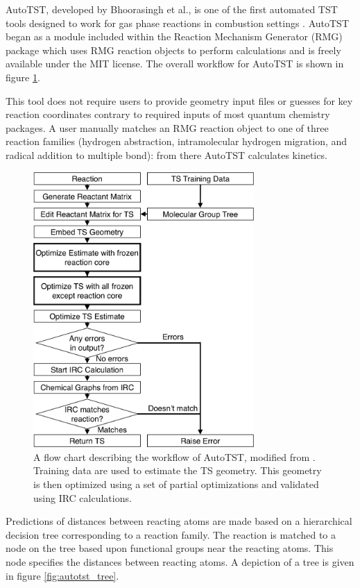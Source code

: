 \documentclass[preprint, 11pt]{elsarticle} %
\begin{document}
AutoTST, developed by Bhoorasingh et al., is one of the first automated TST tools designed to work for gas phase reactions in combustion settings \cite{bhoorasingh:2017}.
AutoTST began as a module included within the Reaction Mechanism Generator (RMG) package which uses RMG reaction objects to perform calculations and is freely available under the MIT license. 
The overall workflow for AutoTST is shown in figure \ref{fig:autotst-overview}.

This tool does not require users to provide geometry input files or guesses for key reaction coordinates contrary to required inputs of most quantum chemistry packages.
A user manually matches an RMG reaction object to one of three reaction families (hydrogen abstraction, intramolecular hydrogen migration, and radical addition to multiple bond): from there AutoTST calculates kinetics. 

\begin{figure}[h!]
    \centering
    \includegraphics[width=0.75\textwidth]{autotst-overview.png}
    \caption{A flow chart describing the workflow of AutoTST, modified from \cite{bhoorasingh:2017}. Training data are used to estimate the TS geometry. This geometry is then optimized using a set of partial optimizations and validated using IRC calculations.}
    \label{fig:autotst-overview}
\end{figure}

Predictions of distances between reacting atoms are made based on a hierarchical decision tree corresponding to a reaction family.
The reaction is matched to a node on the tree based upon functional groups near the reacting atoms. This node specifies the distances between reacting atoms.
A depiction of a tree is given in figure \ref{fig:autotst_tree}.
\end{document}

